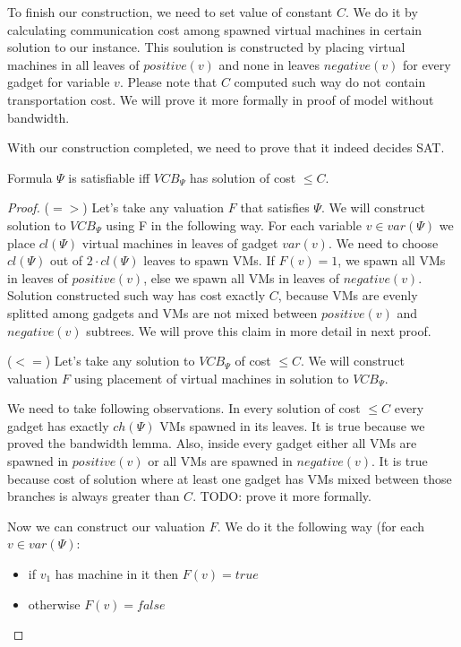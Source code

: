 To finish our construction, we need to set value of constant $C$. We
do it by calculating communication cost among spawned virtual machines in
certain solution to our instance. This soulution is constructed by placing
virtual machines in all leaves of $positive(v)$ and none in leaves
$negative(v)$ for every gadget for variable $v$. Please note that $C$
computed such way do not contain transportation cost. We will prove it
more formally in proof of model without bandwidth.

With our construction completed, we need to prove that it indeed
decides SAT.

\begin{theorem}Formula $\Psi$ is satisfiable iff $VCB_{\Psi}$ has
solution of cost $\leq C$.
\end{theorem}

\begin{proof}
($=>$) Let's take any valuation $F$ that satisfies $\Psi$. We will construct
solution to $VCB_{\Psi}$ using F in the following way. For each
variable $v \in var(\Psi)$ we place $cl(\Psi)$ virtual machines in
leaves of gadget $var(v)$. We need to choose $cl(\Psi)$ out of
$2 \cdot cl(\Psi)$ leaves to spawn VMs. If $F(v) = 1$, we spawn all VMs in leaves
of $positive(v)$, else we spawn all VMs in leaves of
$negative(v)$. Solution constructed such way has cost exactly
$C$, because VMs are evenly splitted among gadgets and VMs are not
mixed between $positive(v)$ and $negative(v)$ subtrees. We will prove
this claim in more detail in next proof. 

($<=$) Let's take any solution to $VCB_{\Psi}$ of cost $\leq C$. We
will construct valuation $F$ using placement of virtual machines in
solution to $VCB_{\Psi}$.

We need to take following observations. In every solution of cost
$\leq C$ every gadget has exactly $ch(\Psi)$ VMs spawned in its
leaves. It is true because we proved the bandwidth lemma. Also, inside
every gadget either all VMs are spawned in $positive(v)$ or all VMs
are spawned in $negative(v)$. It is true because cost of solution
where at least one gadget has VMs mixed between those branches is
always greater than $C$. TODO: prove it more formally.

Now we can construct our valuation $F$. We do it the following way
(for each $v \in var(\Psi)$:

\begin{itemize}
\item if $v_1$ has machine in it then $F(v) = true$
\item otherwise $F(v) = false$
\end{itemize}


\end{proof}
